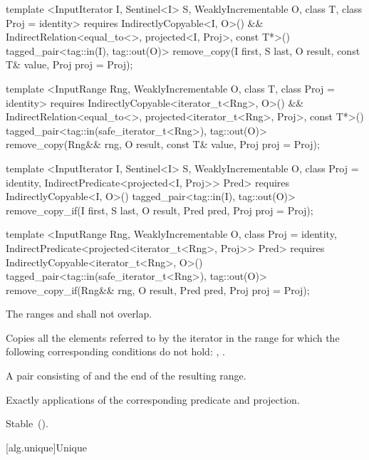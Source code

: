 %
%
\begin{itemdecl}
template <InputIterator I, Sentinel<I> S, WeaklyIncrementable O, class T,
    class Proj = identity>
  requires IndirectlyCopyable<I, O>() &&
    IndirectRelation<equal_to<>, projected<I, Proj>, const T*>()
  tagged_pair<tag::in(I), tag::out(O)>
    remove_copy(I first, S last, O result, const T& value, Proj proj = Proj{});

template <InputRange Rng, WeaklyIncrementable O, class T, class Proj = identity>
  requires IndirectlyCopyable<iterator_t<Rng>, O>() &&
    IndirectRelation<equal_to<>, projected<iterator_t<Rng>, Proj>, const T*>()
  tagged_pair<tag::in(safe_iterator_t<Rng>), tag::out(O)>
    remove_copy(Rng&& rng, O result, const T& value, Proj proj = Proj{});

template <InputIterator I, Sentinel<I> S, WeaklyIncrementable O,
    class Proj = identity, IndirectPredicate<projected<I, Proj>> Pred>
  requires IndirectlyCopyable<I, O>()
  tagged_pair<tag::in(I), tag::out(O)>
    remove_copy_if(I first, S last, O result, Pred pred, Proj proj = Proj{});

template <InputRange Rng, WeaklyIncrementable O, class Proj = identity,
    IndirectPredicate<projected<iterator_t<Rng>, Proj>> Pred>
  requires IndirectlyCopyable<iterator_t<Rng>, O>()
  tagged_pair<tag::in(safe_iterator_t<Rng>), tag::out(O)>
    remove_copy_if(Rng&& rng, O result, Pred pred, Proj proj = Proj{});
\end{itemdecl}

\begin{itemdescr}
\pnum
\requires
The ranges
and
shall not overlap.

\pnum
\effects
Copies all the elements referred to by the iterator
in the range
for which the following corresponding conditions do not hold:
,
.

\pnum
\returns
A pair consisting of  and the end of the resulting range.

\pnum
\complexity
Exactly
applications of the corresponding predicate and projection.

\pnum
\remarks Stable~().
\end{itemdescr}

[alg.unique]{Unique}

